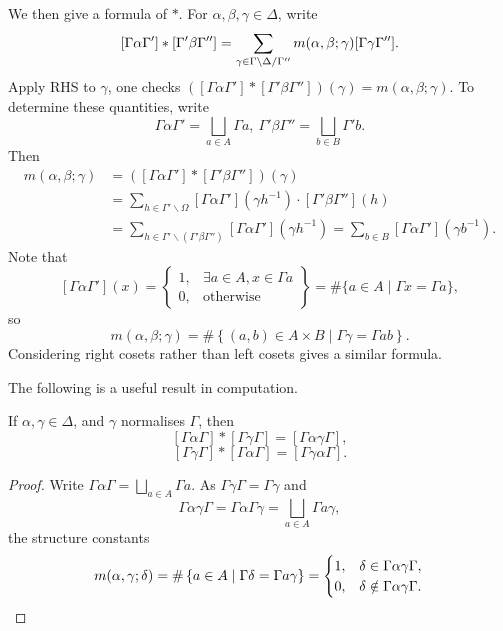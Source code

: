 We then give a formula of $*$.
For $\alpha, \beta, \gamma\in\Delta$, write
\[[\Gamma\alpha\Gamma']*[\Gamma'\beta\Gamma''] =
\sum_{\gamma\in {\Gamma}\backslash {\Delta}\slash {\Gamma''}} m(\alpha, \beta; \gamma) [\Gamma\gamma\Gamma''].\]
Apply RHS to $\gamma$, one checks $\left([\Gamma\alpha\Gamma']*[\Gamma'\beta\Gamma'']\right)(\gamma) = m(\alpha, \beta; \gamma)$.
To determine these quantities,
write \[\Gamma\alpha\Gamma' = \bigsqcup_{a\in A} \Gamma a,\ \Gamma'\beta\Gamma'' = \bigsqcup_{b\in B}\Gamma' b.\]
Then\begin{align*}
    m(\alpha, \beta; \gamma) &= \left([\Gamma\alpha\Gamma']*[\Gamma'\beta\Gamma'']\right)(\gamma)\\
    &= \sum_{h\in\Gamma'\backslash\Omega}[\Gamma\alpha\Gamma'](\gamma h^{-1})\cdot [\Gamma'\beta\Gamma''](h)\\
    &= \sum_{h\in\Gamma'\backslash (\Gamma'\beta\Gamma'')} [\Gamma\alpha\Gamma'](\gamma h^{-1}) = \sum_{b\in B} [\Gamma\alpha\Gamma'](\gamma b^{-1}).
\end{align*}
Note that \[[\Gamma\alpha\Gamma'](x) =
\left\{ \begin{matrix}
    1, &\exists a\in A, x\in \Gamma a\\
    0, &\text{otherwise} 
\end{matrix} \right\} =  \#\{a\in A \mid \Gamma x = \Gamma a\},\]
so \begin{equation}\label{eq: definition of structure constants for Hecke operators}
    m(\alpha, \beta; \gamma)= \#\left\{ (a, b)\in A\times B\mid \Gamma \gamma = \Gamma ab \right\}.
\end{equation}
Considering right cosets rather than left cosets gives a similar formula.

The following is a useful result in computation.
\begin{proposition}\label{alpha * beta = alpha beta if normalises}
    If $\alpha, \gamma\in\Delta$, and $\gamma$ normalises $\Gamma$, then \[[\Gamma\alpha\Gamma]*[\Gamma\gamma\Gamma] = [\Gamma\alpha\gamma\Gamma],\]
    \[[\Gamma\gamma\Gamma]*[\Gamma\alpha\Gamma] = [\Gamma\gamma\alpha\Gamma].\]
\end{proposition}
\begin{proof}
    Write $\Gamma\alpha\Gamma = \bigsqcup_{a\in A}\Gamma a$.
    As $\Gamma\gamma\Gamma = \Gamma\gamma$
    and \[\Gamma\alpha\gamma\Gamma = \Gamma\alpha\Gamma\gamma = \bigsqcup_{a\in A}\Gamma a\gamma,\]
    the structure constants\[
        m(\alpha, \gamma; \delta) = \#\left\{ a\in A\mid \Gamma\delta = \Gamma a\gamma \right\} = \begin{cases}
            1, &\delta\in\Gamma\alpha\gamma\Gamma,\\
            0, &\delta\notin\Gamma\alpha\gamma\Gamma.
        \end{cases}
    \qedhere\]
\end{proof}

